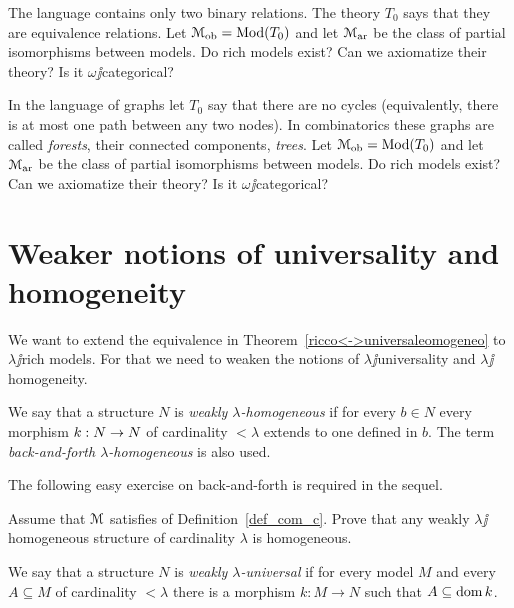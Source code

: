 \documentclass[creche.tex]{subfiles}
\begin{document}
\begin{exercise}
The language contains only two binary relations. The theory $T_0$ says that they are equivalence relations. Let $\EuScript M_{\rm ob}=\mathop{\rm Mod}(T_0)$ and let $\EuScript M_{\rm ar}$ be the class of partial isomorphisms between models. Do rich models exist? Can we axiomatize their theory? Is it $\omega\jj$categorical?\QED
\end{exercise}

\begin{exercise}
In the language of graphs let $T_0$ say that there are no cycles (equivalently, there is at most one path between any two nodes). In combinatorics these graphs are called \textit{forests}, their connected components, \textit{trees}. Let $\EuScript M_{\rm ob}=\mathop{\rm Mod}(T_0)$ and let $\EuScript M_{\rm ar}$  be the class of partial isomorphisms between models. Do rich models exist? Can we axiomatize their theory? Is it $\omega\jj$categorical?\QED
\end{exercise}

\section{Weaker notions of universality and homogeneity}\label{weak}

We want to extend the equivalence in Theorem~\ref{ricco<->universaleomogeneo} to $\lambda\jj$rich models. For that we need to weaken the notions of $\lambda\jj$universality and  $\lambda\jj$homogeneity. 

\begin{definition}
We say that a structure $N$ is \emph{weakly $\lambda$-homogeneous\/} if for every $b\in N$ every morphism $k:N\rightarrow N$ of cardinality $<\lambda$ extends to one defined in $b$. The term \emph{back-and-forth $\lambda$-homogeneous\/} is also used.\QED
\end{definition}

The following easy exercise on back-and-forth is required in the sequel.

\begin{exercise}\label{omogeneo=debolmenteaomogeneo}
Assume that $\EuScript M$ satisfies  of Definition~\ref{def_com_c}. Prove that any weakly $\lambda\jj$ho\-mo\-ge\-ne\-ous structure of cardinality $\lambda$ is homogeneous.\QED
\end{exercise}

\begin{definition}\label{def_weakly_universal}
We say that a structure $N$ is \emph{weakly $\lambda$-universal\/} if for every model $M$ and every $A\subseteq M$ of cardinality $<\lambda$ there is a morphism $k:M\to N$ such that $A\subseteq\mathop{\rm dom} k$.\QED
\end{definition}
\end{document}
